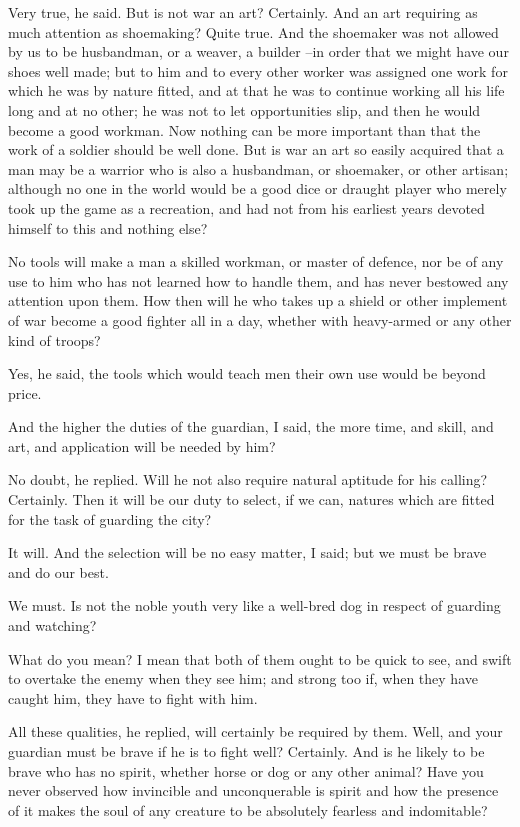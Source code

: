 Very true, he said.
But is not war an art?
Certainly.
And an art requiring as much attention as shoemaking?
Quite true.
And the shoemaker was not allowed by us to be husbandman, or a weaver, a builder --in order that we might have our shoes well made; but to him and to every other worker was assigned one work for which he was by nature fitted, and at that he was to continue working all his life long and at no other; he was not to let opportunities slip, and then he would become a good workman. Now nothing can be more important than that the work of a soldier should be well done. But is war an art so easily acquired that a man may be a warrior who is also a husbandman, or shoemaker, or other artisan; although no one in the world would be a good dice or draught player who merely took up the game as a recreation, and had not from his earliest years devoted himself to this and nothing else?

No tools will make a man a skilled workman, or master of defence, nor be of any use to him who has not learned how to handle them, and has never bestowed any attention upon them. How then will he who takes up a shield or other implement of war become a good fighter all in a day, whether with heavy-armed or any other kind of troops?

Yes, he said, the tools which would teach men their own use would be beyond price.

And the higher the duties of the guardian, I said, the more time, and skill, and art, and application will be needed by him?

No doubt, he replied.
Will he not also require natural aptitude for his calling?
Certainly.
Then it will be our duty to select, if we can, natures which are fitted for the task of guarding the city?

It will.
And the selection will be no easy matter, I said; but we must be brave and do our best.

We must.
Is not the noble youth very like a well-bred dog in respect of guarding and watching?

What do you mean?
I mean that both of them ought to be quick to see, and swift to overtake the enemy when they see him; and strong too if, when they have caught him, they have to fight with him.

All these qualities, he replied, will certainly be required by them.
Well, and your guardian must be brave if he is to fight well?
Certainly.
And is he likely to be brave who has no spirit, whether horse or dog or any other animal? Have you never observed how invincible and unconquerable is spirit and how the presence of it makes the soul of any creature to be absolutely fearless and indomitable?

